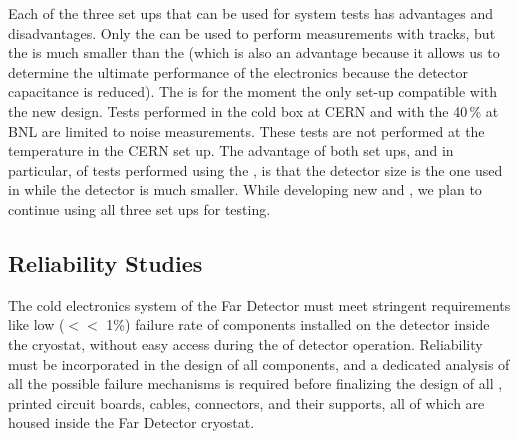 Each of the three set ups that can be used for system tests has advantages
and disadvantages. Only the   can be used to 
perform measurements with tracks, but the  is 
much smaller than the  (which is also an advantage because it
allows us to determine the ultimate performance of the electronics because
the detector capacitance is reduced). The  
is for the moment the only set-up compatible with the new 
design. Tests performed in the cold box at CERN and with the \num{40}\,\%  
at BNL are limited to noise measurements. These tests are not
performed at the  temperature in the CERN set up. The advantage of
both set ups, and in particular, of tests performed using the 
, is that the detector size is the one used in  while the  detector is
much smaller. While developing
new  and , we plan to continue using all
three set ups for testing.

\subsection{Reliability Studies}
\label{sec:fdsp-tpcelec-qa-reliability}

The  cold electronics system of the   Far Detector must meet 
stringent requirements like low ($<<$ 1\%) failure rate of components installed 
on the detector inside the cryostat, without easy access during the \dunelifetime of 
detector operation. Reliability must be incorporated in the 
design of all components, and a dedicated analysis of all the possible failure mechanisms is required 
before finalizing the design of all , printed circuit boards, cables, 
connectors, and their supports, all of which are housed inside the  Far Detector 
cryostat. 

